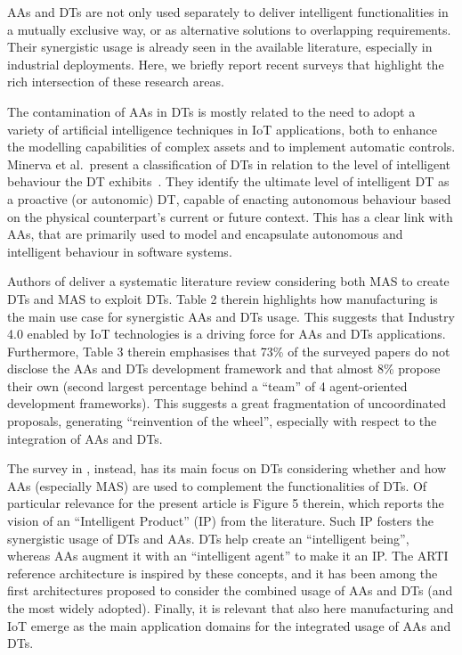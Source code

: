 


AAs and DTs are not only used separately 
to deliver intelligent functionalities 
in a mutually exclusive way, 
or as alternative solutions to overlapping requirements.
Their synergistic usage is already seen in the available literature, 
especially in industrial deployments. Here, we briefly report recent surveys that highlight the rich intersection of these research areas.

The contamination of AAs in DTs is mostly related to the need to adopt a variety of artificial intelligence techniques in IoT applications, both to enhance the modelling capabilities of complex assets and to implement automatic controls.
Minerva et al.\ present a classification of DTs in relation to the level of intelligent behaviour the DT exhibits~\cite{Minerva2023}.
They identify the ultimate level of intelligent DT as a proactive (or autonomic) DT, capable of enacting autonomous behaviour based on the physical counterpart's current or future context.
This has a clear link with AAs, that are primarily used to model and encapsulate autonomous and intelligent behaviour in software systems.

Authors of \cite{Pretel2024} deliver a systematic literature review considering both MAS to create DTs and MAS to exploit DTs. 
Table 2 therein highlights how manufacturing is the main use case for synergistic AAs and DTs usage. 
This suggests that Industry 4.0 enabled by IoT technologies is a driving force for AAs and DTs applications. 
Furthermore, Table 3 therein emphasises that 73\% of the surveyed papers do not disclose the AAs and DTs development framework 
and that almost 8\% propose their own 
    (second largest percentage behind a ``team'' of 4 agent-oriented development frameworks). 
This suggests a great fragmentation of uncoordinated proposals, 
generating ``reinvention of the wheel'', especially with respect to the integration of AAs and DTs.

The survey in \cite{10.1115/1.4050244}, instead, has its main focus on DTs considering whether and how AAs (especially MAS) are used to complement the functionalities of DTs. 
Of particular relevance for the present article is Figure 5 therein, 
which reports the vision of an ``Intelligent Product'' (IP) from the literature. 
Such IP fosters the synergistic usage of DTs and AAs. 
DTs help create an ``intelligent being'', 
whereas AAs augment it with an ``intelligent agent'' to make it an IP. 
The ARTI reference architecture is inspired by these concepts, 
and it has been among the first architectures proposed to consider 
the combined usage of AAs and DTs (and the most widely adopted). 
Finally, it is relevant that also here manufacturing and IoT emerge as the main application domains for the integrated usage of AAs and DTs.

